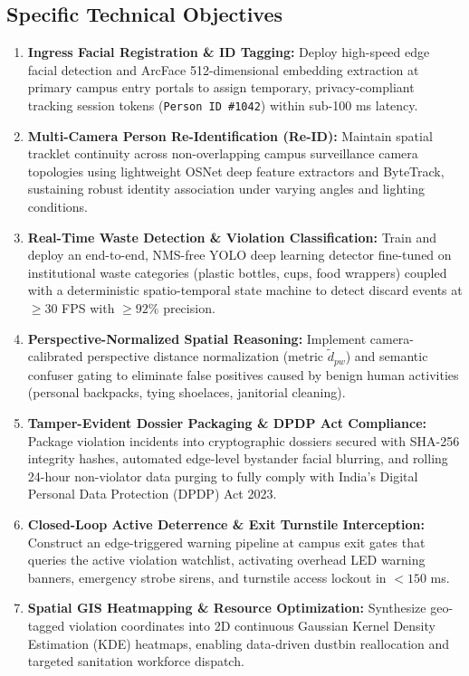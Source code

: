 \documentclass[12pt,a4paper]{report}
\begin{document}
\subsection{Specific Technical Objectives}
\begin{enumerate}
    \item \textbf{Ingress Facial Registration \& ID Tagging:} Deploy high-speed edge facial detection and ArcFace 512-dimensional embedding extraction at primary campus entry portals to assign temporary, privacy-compliant tracking session tokens (\texttt{Person ID \#1042}) within sub-100 ms latency.
    \item \textbf{Multi-Camera Person Re-Identification (Re-ID):} Maintain spatial tracklet continuity across non-overlapping campus surveillance camera topologies using lightweight OSNet deep feature extractors and ByteTrack, sustaining robust identity association under varying angles and lighting conditions.
    \item \textbf{Real-Time Waste Detection \& Violation Classification:} Train and deploy an end-to-end, NMS-free YOLO deep learning detector fine-tuned on institutional waste categories (plastic bottles, cups, food wrappers) coupled with a deterministic spatio-temporal state machine to detect discard events at $\ge 30$ FPS with $\ge 92\%$ precision.
    \item \textbf{Perspective-Normalized Spatial Reasoning:} Implement camera-calibrated perspective distance normalization (metric $\tilde{d}_{pw}$) and semantic confuser gating to eliminate false positives caused by benign human activities (personal backpacks, tying shoelaces, janitorial cleaning).
    \item \textbf{Tamper-Evident Dossier Packaging \& DPDP Act Compliance:} Package violation incidents into cryptographic dossiers secured with SHA-256 integrity hashes, automated edge-level bystander facial blurring, and rolling 24-hour non-violator data purging to fully comply with India's Digital Personal Data Protection (DPDP) Act 2023.
    \item \textbf{Closed-Loop Active Deterrence \& Exit Turnstile Interception:} Construct an edge-triggered warning pipeline at campus exit gates that queries the active violation watchlist, activating overhead LED warning banners, emergency strobe sirens, and turnstile access lockout in $< 150$ ms.
    \item \textbf{Spatial GIS Heatmapping \& Resource Optimization:} Synthesize geo-tagged violation coordinates into 2D continuous Gaussian Kernel Density Estimation (KDE) heatmaps, enabling data-driven dustbin reallocation and targeted sanitation workforce dispatch.
\end{enumerate}
\end{document}
